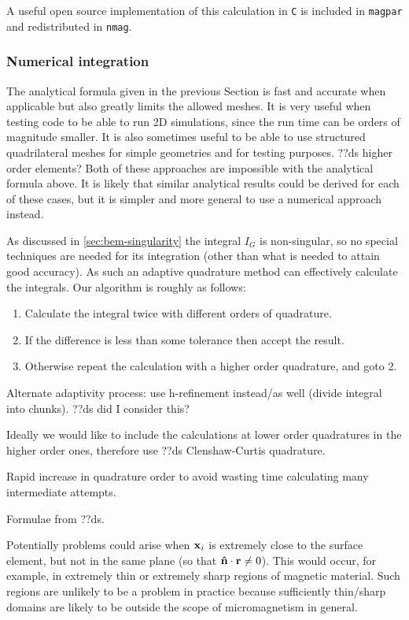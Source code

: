 A useful open source implementation of this calculation in \texttt{C} is included in \texttt{magpar}\cite{magpar-website-dummy} and redistributed in \texttt{nmag}\cite{nmag-website-dummy}.


\subsubsection{Numerical integration}

The analytical formula given in the previous Section is fast and accurate when applicable but also greatly limits the allowed meshes.
It is very useful when testing code to be able to run 2D simulations, since the run time can be orders of magnitude smaller.
It is also sometimes useful to be able to use structured quadrilateral meshes for simple geometries and for testing purposes.
??ds higher order elements?
Both of these approaches are impossible with the analytical formula above.
It is likely that similar analytical results could be derived for each of these cases, but it is simpler and more general to use a numerical approach instead.

As discussed in \autoref{sec:bem-singularity} the integral $I_G$ is non-singular, so no special techniques are needed for its integration (other than what is needed to attain good accuracy).
As such an adaptive quadrature method can effectively calculate the integrals.
Our algorithm is roughly as follows:
\begin{enumerate}
\item Calculate the integral twice with different orders of quadrature.
\item If the difference is less than some tolerance then accept the result.
\item Otherwise repeat the calculation with a higher order quadrature, and goto 2.
\end{enumerate}

Alternate adaptivity process: use h-refinement instead/as well (divide integral into chunks). ??ds did I consider this?

Ideally we would like to include the calculations at lower order quadratures in the higher order ones, therefore use ??ds Clenshaw-Curtis quadrature\cite{Trefethen2008}.

Rapid increase in quadrature order to avoid wasting time calculating many intermediate attempts.

Formulae from ??ds.

Potentially problems could arise when $\mathbf{x}_i$ is extremely close to the surface element, but not in the same plane (so that $\mathbf{\hat{n}} \cdot \mathbf{r} \neq 0$).
This would occur, for example, in extremely thin or extremely sharp regions of magnetic material.
Such regions are unlikely to be a problem in practice because sufficiently thin/sharp domains are likely to be outside the scope of micromagnetism in general.



